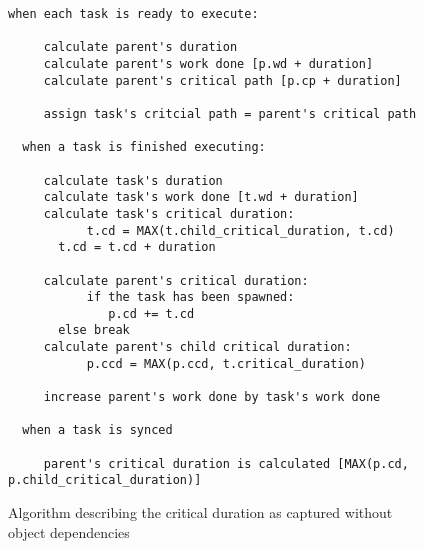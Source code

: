 \begin{figure}
\begin{lstlisting}[breaklines, showstringspaces=false]
  when each task is ready to execute:

     calculate parent's duration
     calculate parent's work done [p.wd + duration]
     calculate parent's critical path [p.cp + duration]     

     assign task's critcial path = parent's critical path

  when a task is finished executing:

     calculate task's duration
     calculate task's work done [t.wd + duration]
     calculate task's critical duration: 
     	   t.cd = MAX(t.child_critical_duration, t.cd)
	   t.cd = t.cd + duration
     
     calculate parent's critical duration:
     	   if the task has been spawned:
	       	  p.cd += t.cd
	   else break
     calculate parent's child critical duration:
     	   p.ccd = MAX(p.ccd, t.critical_duration)

     increase parent's work done by task's work done

  when a task is synced

     parent's critical duration is calculated [MAX(p.cd, p.child_critical_duration)]

\end{lstlisting}




\caption{Algorithm describing the critical duration as captured without object dependencies}
\label{fig:code_nodeps}
 \end{figure}
\subsection{}